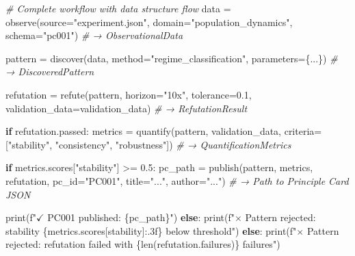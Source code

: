 \documentclass[
]{article}
\newenvironment{Shaded}{}{}
\newcommand{\BuiltInTok}[1]{\textcolor[rgb]{0.00,0.50,0.00}{#1}}
\newcommand{\CommentTok}[1]{\textcolor[rgb]{0.38,0.63,0.69}{\textit{#1}}}
\newcommand{\ControlFlowTok}[1]{\textcolor[rgb]{0.00,0.44,0.13}{\textbf{#1}}}
\newcommand{\FloatTok}[1]{\textcolor[rgb]{0.25,0.63,0.44}{#1}}
\newcommand{\NormalTok}[1]{#1}
\newcommand{\OperatorTok}[1]{\textcolor[rgb]{0.40,0.40,0.40}{#1}}
\newcommand{\SpecialCharTok}[1]{\textcolor[rgb]{0.25,0.44,0.63}{#1}}
\newcommand{\SpecialStringTok}[1]{\textcolor[rgb]{0.73,0.40,0.53}{#1}}
\newcommand{\StringTok}[1]{\textcolor[rgb]{0.25,0.44,0.63}{#1}}
\begin{document}
\begin{Shaded}
\begin{Highlighting}[]
\CommentTok{\# Complete workflow with data structure flow}
\NormalTok{data }\OperatorTok{=}\NormalTok{ observe(source}\OperatorTok{=}\StringTok{"experiment.json"}\NormalTok{, domain}\OperatorTok{=}\StringTok{"population\_dynamics"}\NormalTok{, schema}\OperatorTok{=}\StringTok{"pc001"}\NormalTok{)}
\CommentTok{\# → ObservationalData}

\NormalTok{pattern }\OperatorTok{=}\NormalTok{ discover(data, method}\OperatorTok{=}\StringTok{"regime\_classification"}\NormalTok{, parameters}\OperatorTok{=}\NormalTok{\{...\})}
\CommentTok{\# → DiscoveredPattern}

\NormalTok{refutation }\OperatorTok{=}\NormalTok{ refute(pattern, horizon}\OperatorTok{=}\StringTok{"10x"}\NormalTok{, tolerance}\OperatorTok{=}\FloatTok{0.1}\NormalTok{, validation\_data}\OperatorTok{=}\NormalTok{validation\_data)}
\CommentTok{\# → RefutationResult}

\ControlFlowTok{if}\NormalTok{ refutation.passed:}
\NormalTok{    metrics }\OperatorTok{=}\NormalTok{ quantify(pattern, validation\_data, criteria}\OperatorTok{=}\NormalTok{[}\StringTok{"stability"}\NormalTok{, }\StringTok{"consistency"}\NormalTok{, }\StringTok{"robustness"}\NormalTok{])}
    \CommentTok{\# → QuantificationMetrics}

    \ControlFlowTok{if}\NormalTok{ metrics.scores[}\StringTok{"stability"}\NormalTok{] }\OperatorTok{\textgreater{}=} \FloatTok{0.5}\NormalTok{:}
\NormalTok{        pc\_path }\OperatorTok{=}\NormalTok{ publish(pattern, metrics, refutation, pc\_id}\OperatorTok{=}\StringTok{"PC001"}\NormalTok{, title}\OperatorTok{=}\StringTok{"..."}\NormalTok{, author}\OperatorTok{=}\StringTok{"..."}\NormalTok{)}
        \CommentTok{\# → Path to Principle Card JSON}

        \BuiltInTok{print}\NormalTok{(}\SpecialStringTok{f"$\checkmark$ PC001 published: }\SpecialCharTok{\{}\NormalTok{pc\_path}\SpecialCharTok{\}}\SpecialStringTok{"}\NormalTok{)}
    \ControlFlowTok{else}\NormalTok{:}
        \BuiltInTok{print}\NormalTok{(}\SpecialStringTok{f"$\times$ Pattern rejected: stability }\SpecialCharTok{\{}\NormalTok{metrics}\SpecialCharTok{.}\NormalTok{scores[}\StringTok{\textquotesingle{}stability\textquotesingle{}}\NormalTok{]}\SpecialCharTok{:.3f\}}\SpecialStringTok{ below threshold"}\NormalTok{)}
\ControlFlowTok{else}\NormalTok{:}
    \BuiltInTok{print}\NormalTok{(}\SpecialStringTok{f"$\times$ Pattern rejected: refutation failed with }\SpecialCharTok{\{}\BuiltInTok{len}\NormalTok{(refutation.failures)}\SpecialCharTok{\}}\SpecialStringTok{ failures"}\NormalTok{)}
\end{Highlighting}
\end{Shaded}
\end{document}
